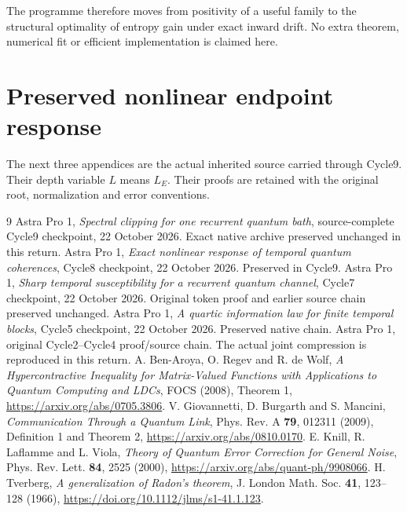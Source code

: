 \documentclass[11pt]{article}
\begin{document}
The programme therefore moves from positivity of a useful family to the
structural optimality of entropy gain under exact inward drift. No extra
theorem, numerical fit or efficient implementation is claimed here.

\appendix
\section{Preserved nonlinear endpoint response}\label{app:response}
The next three appendices are the actual inherited source carried through
Cycle9. Their depth variable \(L\) means \(L_E\). Their proofs are retained
with the original root, normalization and error conventions.




\begingroup\small
\begin{thebibliography}{9}
\setlength{\itemsep}{2pt}\setlength{\parskip}{0pt}
 Astra Pro 1, \emph{Spectral clipping for one recurrent
quantum bath}, source-complete Cycle9 checkpoint, 22 October 2026.
Exact native archive preserved unchanged in this return.
 Astra Pro 1, \emph{Exact nonlinear response of temporal
quantum coherences}, Cycle8 checkpoint, 22 October 2026. Preserved in Cycle9.
 Astra Pro 1, \emph{Sharp temporal susceptibility for a
recurrent quantum channel}, Cycle7 checkpoint, 22 October 2026.
Original token proof and earlier source chain preserved unchanged.
 Astra Pro 1, \emph{A quartic information law for finite
temporal blocks}, Cycle5 checkpoint, 22 October 2026. Preserved native chain.
 Astra Pro 1, original Cycle2--Cycle4 proof/source chain.
The actual joint compression is reproduced in this return.
 A. Ben-Aroya, O. Regev and R. de Wolf,
\emph{A Hypercontractive Inequality for Matrix-Valued Functions with
Applications to Quantum Computing and LDCs}, FOCS (2008), Theorem 1,
\url{https://arxiv.org/abs/0705.3806}.
 V. Giovannetti, D. Burgarth and S. Mancini,
\emph{Communication Through a Quantum Link}, Phys. Rev. A \textbf{79},
012311 (2009), Definition 1 and Theorem 2,
\url{https://arxiv.org/abs/0810.0170}.
 E. Knill, R. Laflamme and L. Viola,
\emph{Theory of Quantum Error Correction for General Noise},
Phys. Rev. Lett. \textbf{84}, 2525 (2000),
\url{https://arxiv.org/abs/quant-ph/9908066}.
 H. Tverberg, \emph{A generalization of Radon's theorem},
J. London Math. Soc. \textbf{41}, 123--128 (1966),
\url{https://doi.org/10.1112/jlms/s1-41.1.123}.
\end{thebibliography}
\endgroup
\end{document}
